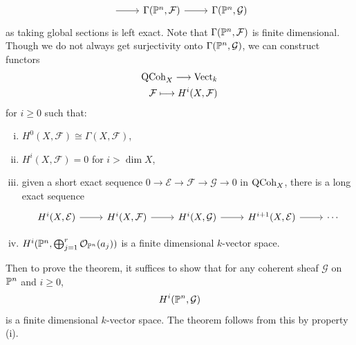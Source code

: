 \begin{remark}
\begin{enumerate}
\[\begin{tikzcd}
          \ar[r] & \Gamma(\PP^n, \mathcal{F})
          \ar[r] & \Gamma(\PP^n, \mathcal{G})
        \end{tikzcd}
      \]
      as taking global sections is left
      exact. Note that $\Gamma(\mathbb{P}^n, \mathcal{F})$
      is finite dimensional. Though we do
      not always get surjectivity onto
      $\Gamma(\mathbb{P}^n, \mathcal{G})$, we
      can construct functors
      \begin{align*}
        \operatorname{QCoh}_X \longrightarrow \mathrm{Vect}_k \\
        \mathcal{F} \longmapsto H^i(X, \mathcal{F})
      \end{align*}
      for $i \ge 0$ such that:
      \begin{enumerate}[(i)]
        \item $H^0(X, \mathcal{F}) \cong \Gamma(X, \mathcal{F})$,
        \item $H^i(X, \mathcal{F}) = 0$ for
          $i > \dim X$,
        \item given a short exact sequence
          $0 \to \mathcal{E} \to \mathcal{F} \to \mathcal{G} \to 0$
          in $\operatorname{QCoh}_X$, there is a long
          exact sequence
          \[
            \begin{tikzcd}
              H^i(X, \mathcal{E}) \ar[r] & H^i(X, \mathcal{F})
              \ar[r] & H^i(X, \mathcal{G})
              \ar[r] & H^{i + 1}(X, \mathcal{E})
              \ar[r] & \cdots
            \end{tikzcd}
          \]
        \item $H^i(\mathbb{P}^n, \bigoplus_{j = 1}^r \mathcal{O}_{\mathbb{P}^n}(a_j))$
          is a finite dimensional $k$-vector space.
      \end{enumerate}
      Then to prove the theorem, it suffices
      to show that
      for any coherent sheaf $\mathcal{G}$
      on $\mathbb{P}^n$ and $i \ge 0$,
      \[H^i(\mathbb{P}^n, \mathcal{G})\]
      is a finite
      dimensional $k$-vector space.
      The theorem follows from this by
      property (i).


\end{enumerate}
\end{remark}
